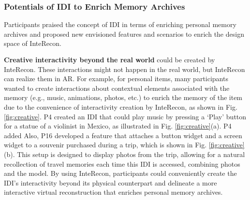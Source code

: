 \subsubsection{Potentials of IDI to Enrich Memory Archives}
\label{fi:potentials}
Participants praised the concept of IDI in terms of enriching personal memory archives and proposed new envisioned features and scenarios to enrich the design space of InteRecon.



\textbf{Creative interactivity beyond the real world} could be created by InteRecon. 
These interactions might not happen in the real world, but InteRecon can realize them in AR.
For example, for personal items, many participants wanted to create interactions about contextual elements associated with the memory (e.g., music, animations, photos, etc.) to enrich the memory of the item due to the convenience of interactivity creation by InteRecon, as shown in Fig. \ref{fig:creative}.
P4 created an IDI that could play music by pressing a `Play' button for a statue of a violinist in Mexico, as illustrated in Fig. \ref{fig:creative}(a). 
P4 added 
Also, P16 developed a feature that attaches a button widget and a screen widget to a souvenir purchased during a trip, which is shown in Fig. \ref{fig:creative}(b). This setup is designed to display photos from the trip, allowing for a natural recollection of travel memories each time this IDI is accessed, combining photos and the model.
By using InteRecon, participants could conveniently create the IDI's interactivity beyond its physical counterpart and delineate a more interactive virtual reconstruction that enriches personal memory archives.

